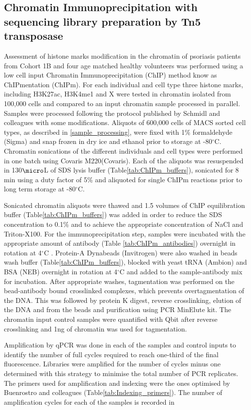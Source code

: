 \subsection{Chromatin Immunoprecipitation with sequencing library preparation by Tn5 transposase}
Assessment of histone marks modification in the chromatin of psoriasis patients from Cohort 1B and four age matched healthy volunteers was performed using a low cell input Chromatin Immunoprecipitation (ChIP) method know as ChIPmentation (ChIPm). For each individual and cell type three histone marks, including H3K27ac, H3K4me1 and X were tested in chromatin isolated from 100,000 cells and compared to an input chromatin sample processed in parallel. Samples were processed following the protocol published by Schmidl and colleagues \parencite{Schmidl2015} with some modifications. Aliquots of 600,000 cells of MACS sorted cell types, as described in \ref{sample_processing}, were fixed with 1\% formaldehyde (Sigma) and snap frozen in dry ice and ethanol prior to storage at -80{$^\circ$}C. Chromatin sonications of the different individuals and cell types were performed in one batch using Covaris M220(Covaris). Each of the aliquots was resuspended in 130$\micro$L of SDS lysis buffer (Table\ref{tab:ChIPm_buffers}), sonicated for 8 min using a duty factor of 5\% and aliquoted for single ChIPm reactions prior to long term storage at -80{$^\circ$}C.

Sonicated chromatin aliquots were thawed and 1.5 volumes of ChIP equilibration buffer (Table\ref{tab:ChIPm_buffers}) was added in order to  reduce the SDS concentration to 0.1\% and to achieve the appropriate concentration of NaCl and Triton-X100. For the immunoprecipitation step, samples were incubated with the appropriate amount of antibody (Table \ref{tab:ChIPm_antibodies}) overnight in rotation  at 4{$^\circ$}C . Protein-A Dynabeads (Invitrogen) were also washed in beads wash buffer (Table\ref{tab:ChIPm_buffers}), blocked with yeast tRNA (Ambion) and BSA (NEB) overnight in rotation at 4{$^\circ$}C and added to the sample-antibody mix for incubation. After appropriate washes, tagmentation was performed on the bead-antibody bound crosslinked complexes, which prevents overtagmentation of the DNA. This was followed by protein K digest, reverse crosslinking, elution of the DNA and from the beads and purification using PCR MinElute kit. The chromatin input control samples were quantified with Qbit after reverse crosslinking and 1ng of chromatin was used for tagmentation.

Amplification by qPCR was done in each of the samples and control inputs to identify the number of full cycles required to reach one-third of the final fluorescence. Libraries were amplified for the number of cycles minus one determined with this strategy to minimise the total number of PCR replicates. The primers used for amplification and indexing were the ones optimised by Buenrostro and colleagues (Table\ref{tab:Indexing_primers}). The number of amplification cycles for each of the samples is recorded in %

